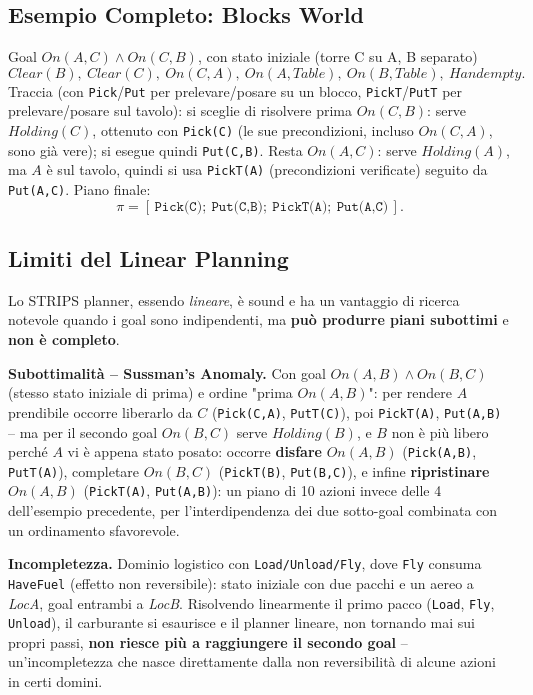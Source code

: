 \documentclass[a4paper,11pt]{article}
\begin{document}
\subsection{Esempio Completo: Blocks World}

Goal $On(A,C)\wedge On(C,B)$, con stato iniziale (torre C su A, B separato)
\[
Clear(B),\ Clear(C),\ On(C,A),\ On(A,Table),\ On(B,Table),\ Handempty.
\]
Traccia (con \texttt{Pick}/\texttt{Put} per prelevare/posare su un blocco, \texttt{PickT}/\texttt{PutT} per prelevare/posare sul tavolo): si sceglie di risolvere prima $On(C,B)$: serve $Holding(C)$, ottenuto con \texttt{Pick(C)} (le sue precondizioni, incluso $On(C,A)$, sono già vere); si esegue quindi \texttt{Put(C,B)}. Resta $On(A,C)$: serve $Holding(A)$, ma $A$ è sul tavolo, quindi si usa \texttt{PickT(A)} (precondizioni verificate) seguito da \texttt{Put(A,C)}. Piano finale:
\[
\pi = [\,\texttt{Pick(C)};\ \texttt{Put(C,B)};\ \texttt{PickT(A)};\ \texttt{Put(A,C)}\,].
\]

\subsection{Limiti del Linear Planning}

Lo STRIPS planner, essendo \emph{lineare}, è sound e ha un vantaggio di ricerca notevole quando i goal sono indipendenti, ma \textbf{può produrre piani subottimi} e \textbf{non è completo}.

\textbf{Subottimalità -- Sussman's Anomaly.} Con goal $On(A,B)\wedge On(B,C)$ (stesso stato iniziale di prima) e ordine "prima $On(A,B)$": per rendere $A$ prendibile occorre liberarlo da $C$ (\texttt{Pick(C,A)}, \texttt{PutT(C)}), poi \texttt{PickT(A)}, \texttt{Put(A,B)} -- ma per il secondo goal $On(B,C)$ serve $Holding(B)$, e $B$ non è più libero perché $A$ vi è appena stato posato: occorre \textbf{disfare} $On(A,B)$ (\texttt{Pick(A,B)}, \texttt{PutT(A)}), completare $On(B,C)$ (\texttt{PickT(B)}, \texttt{Put(B,C)}), e infine \textbf{ripristinare} $On(A,B)$ (\texttt{PickT(A)}, \texttt{Put(A,B)}): un piano di 10 azioni invece delle 4 dell'esempio precedente, per l'interdipendenza dei due sotto-goal combinata con un ordinamento sfavorevole.

\textbf{Incompletezza.} Dominio logistico con \texttt{Load/Unload/Fly}, dove \texttt{Fly} consuma \texttt{HaveFuel} (effetto non reversibile): stato iniziale con due pacchi e un aereo a \emph{LocA}, goal entrambi a \emph{LocB}. Risolvendo linearmente il primo pacco (\texttt{Load}, \texttt{Fly}, \texttt{Unload}), il carburante si esaurisce e il planner lineare, non tornando mai sui propri passi, \textbf{non riesce più a raggiungere il secondo goal} -- un'incompletezza che nasce direttamente dalla non reversibilità di alcune azioni in certi domini.
\end{document}
